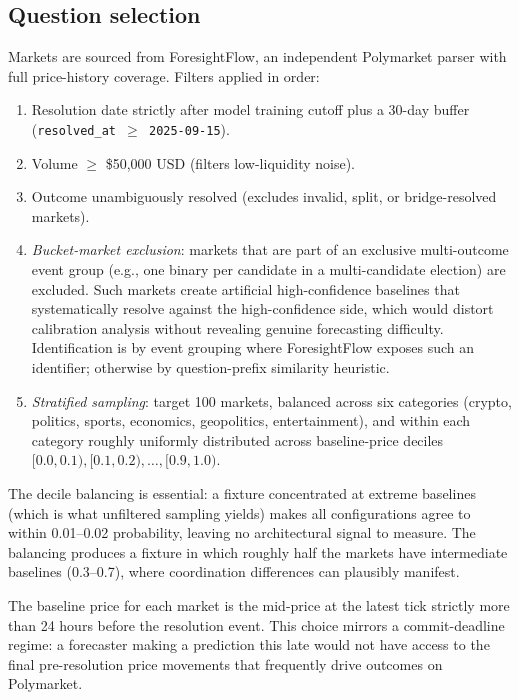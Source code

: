 \documentclass[11pt]{article}
\begin{document}
\subsection{Question selection}
\label{sec:experiment-fixture}

Markets are sourced from ForesightFlow, an independent Polymarket parser with full price-history coverage. Filters applied in order:

\begin{enumerate}
\item Resolution date strictly after model training cutoff plus a 30-day buffer (\texttt{resolved\_at $\geq$ 2025-09-15}).
\item Volume $\geq$ \$50{,}000 USD (filters low-liquidity noise).
\item Outcome unambiguously resolved (excludes invalid, split, or bridge-resolved markets).
\item \emph{Bucket-market exclusion}: markets that are part of an exclusive multi-outcome event group (e.g., one binary per candidate in a multi-candidate election) are excluded. Such markets create artificial high-confidence baselines that systematically resolve against the high-confidence side, which would distort calibration analysis without revealing genuine forecasting difficulty. Identification is by event grouping where ForesightFlow exposes such an identifier; otherwise by question-prefix similarity heuristic.
\item \emph{Stratified sampling}: target 100 markets, balanced across six categories (crypto, politics, sports, economics, geopolitics, entertainment), and within each category roughly uniformly distributed across baseline-price deciles $[0.0, 0.1), [0.1, 0.2), \ldots, [0.9, 1.0)$.
\end{enumerate}

The decile balancing is essential: a fixture concentrated at extreme baselines (which is what unfiltered sampling yields) makes all configurations agree to within 0.01--0.02 probability, leaving no architectural signal to measure. The balancing produces a fixture in which roughly half the markets have intermediate baselines (0.3--0.7), where coordination differences can plausibly manifest.

The baseline price for each market is the mid-price at the latest tick strictly more than 24 hours before the resolution event. This choice mirrors a commit-deadline regime: a forecaster making a prediction this late would not have access to the final pre-resolution price movements that frequently drive outcomes on Polymarket.
\end{document}
